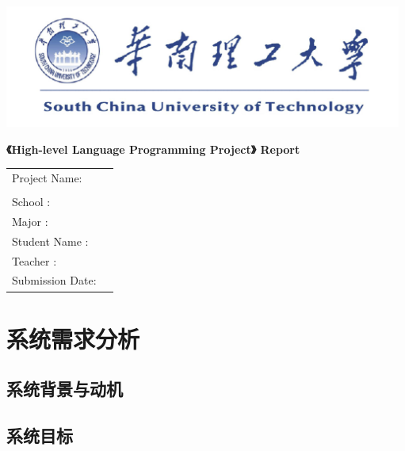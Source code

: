 \documentclass{article}
\begin{document}
\begin{titlepage}
    \centering
    \vspace*{1cm}

    \includegraphics[width=\textwidth]{img/logo.png}

    \fontsize{24pt}{32pt}\selectfont
    \textbf{《High-level Language Programming Project》 Report}
    \vspace{6cm}

    \fontsize{20pt}{20pt}\selectfont
    \begin{tabular}{ll}
        Project Name:    &              \\
                         &              \\
        School       :   & \hspace{6cm} \\
        Major        :   & \hspace{6cm} \\
        Student Name :   & \hspace{6cm} \\
        Teacher      :   & \hspace{6cm} \\
        Submission Date: & \hspace{6cm} \\
    \end{tabular}

    \vfill

    \vspace{1cm}
\end{titlepage}

\section{系统需求分析}
\subsection{系统背景与动机}

\subsection{ 系统目标}
\end{document}
